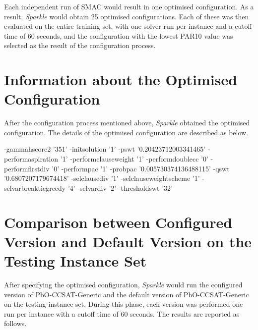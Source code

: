 \documentclass[british]{article}
\begin{document}
Each independent run of SMAC would result in one optimised configuration. As a result, \emph{Sparkle} would obtain 25 optimised configurations. Each of these was then evaluated on the entire training set, with one solver run per instance and a cutoff time of 60 seconds, and the configuration with the lowest PAR10 value was selected as the result of the configuration process.

\section{Information about the Optimised Configuration}

After the configuration process mentioned above, \emph{Sparkle} obtained the optimised configuration. The details of the optimised configuration are described as below.

\vspace{5mm}

 -gamma\textunderscore hscore2 '351' -init\textunderscore solution '1' -p\textunderscore swt '0.20423712003341465' -perform\textunderscore aspiration '1' -perform\textunderscore clause\textunderscore weight '1' -perform\textunderscore double\textunderscore cc '0' -perform\textunderscore first\textunderscore div '0' -perform\textunderscore pac '1' -prob\textunderscore pac '0.005730374136488115' -q\textunderscore swt '0.6807207179674418' -sel\textunderscore clause\textunderscore div '1' -sel\textunderscore clause\textunderscore weight\textunderscore scheme '1' -sel\textunderscore var\textunderscore break\textunderscore tie\textunderscore greedy '4' -sel\textunderscore var\textunderscore div '2' -threshold\textunderscore swt '32'

\vspace{5mm}


\section{Comparison between Configured Version and Default Version on the Testing Instance Set}

After specifying the optimised configuration, \emph{Sparkle} would run the configured version of PbO-CCSAT-Generic and the default version of PbO-CCSAT-Generic on the testing instance set. During this phase, each version was performed one run per instance with a cutoff time of 60 seconds. The results are reported as follows.
\end{document}
